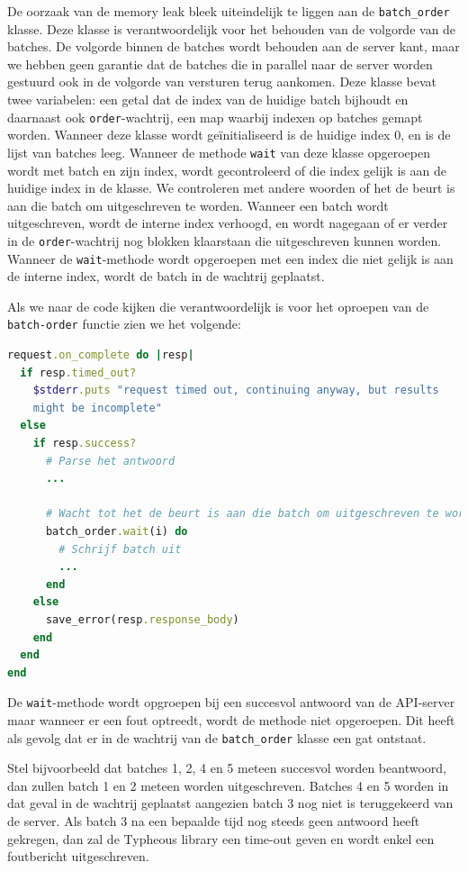 De oorzaak van de memory leak bleek uiteindelijk te liggen aan de
\texttt{batch\_order} klasse. Deze klasse is verantwoordelijk voor het behouden 
van de volgorde van de batches. De volgorde binnen de batches wordt behouden 
aan de server kant, maar we hebben geen garantie dat de batches die in parallel 
naar de server worden gestuurd ook in de volgorde van versturen terug aankomen. 
Deze klasse bevat twee variabelen: een getal dat de index van de huidige
batch bijhoudt en daarnaast ook \texttt{order}-wachtrij, een map waarbij indexen
op batches gemapt worden. Wanneer deze klasse wordt geïnitialiseerd is de
huidige index 0, en is de lijst van batches leeg. Wanneer de methode
\texttt{wait} van deze klasse opgeroepen wordt met batch en zijn index, wordt
gecontroleerd of die index gelijk is aan de huidige index in de klasse. We
controleren met andere woorden of het de beurt is aan die batch om uitgeschreven
te worden. Wanneer een batch wordt uitgeschreven, wordt de interne index
verhoogd, en wordt nagegaan of er verder in de \texttt{order}-wachtrij nog
blokken klaarstaan die uitgeschreven kunnen worden. Wanneer de
\texttt{wait}-methode wordt opgeroepen met een index die niet gelijk is aan de
interne index, wordt de batch in de wachtrij geplaatst.

Als we naar de code kijken die verantwoordelijk is voor het oproepen van de 
\texttt{batch-order} functie zien we het volgende: 

\begin{lstlisting}[language=Ruby]
request.on_complete do |resp|
  if resp.timed_out?
    $stderr.puts "request timed out, continuing anyway, but results 
    might be incomplete"
  else
    if resp.success?
      # Parse het antwoord
      ...

      # Wacht tot het de beurt is aan die batch om uitgeschreven te worden
      batch_order.wait(i) do
        # Schrijf batch uit
        ...
      end
    else
      save_error(resp.response_body)
    end
  end
end
\end{lstlisting}

De \texttt{wait}-methode wordt opgroepen bij een succesvol antwoord van de
API-server maar wanneer er een fout optreedt, wordt de methode niet opgeroepen.
Dit heeft als gevolg dat er in de wachtrij van de \texttt{batch\_order} klasse
een gat ontstaat. 

Stel bijvoorbeeld dat batches 1, 2, 4 en 5 meteen succesvol worden beantwoord,
dan zullen batch 1 en 2 meteen worden uitgeschreven. Batches 4 en 5 worden in
dat geval in de wachtrij geplaatst aangezien batch 3 nog niet is teruggekeerd
van de server. Als batch 3 na een bepaalde tijd nog steeds geen antwoord heeft
gekregen, dan zal de Typheous library een time-out geven en wordt enkel een
foutbericht uitgeschreven.

